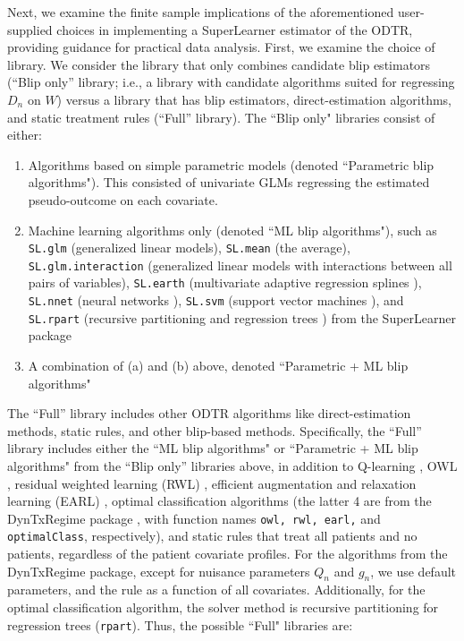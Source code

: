 \documentclass[a4paper,12pt]{article}
\begin{document}
Next, we examine the finite sample implications of the aforementioned user-supplied choices in implementing a SuperLearner estimator of the ODTR, providing guidance for practical data analysis. First, we examine the choice of library. We consider the library that only combines candidate blip estimators (``Blip only” library; i.e., a library with candidate algorithms suited for regressing $D_n$ on $W$) versus a library that has blip estimators, direct-estimation algorithms, and static treatment rules (``Full” library). The ``Blip only" libraries consist of either:
\begin{enumerate}
    \item[(a)] Algorithms based on simple parametric models (denoted ``Parametric blip algorithms"). This consisted of univariate GLMs regressing the estimated pseudo-outcome on each covariate.
    \item[(b)] Machine learning algorithms only (denoted ``ML blip algorithms"), such as \texttt{SL.glm} (generalized linear models), \texttt{SL.mean} (the average), \texttt{SL.glm.interaction} (generalized linear models with interactions between all pairs of variables), \texttt{SL.earth} (multivariate adaptive regression splines \citep{friedman1991multivariate}), \texttt{SL.nnet} (neural networks \citep{ripley1996pattern}), \texttt{SL.svm} (support vector machines \citep{chang2011libsvm}), and \texttt{SL.rpart} (recursive partitioning and regression trees \citep{breiman2017classification}) from the SuperLearner package \citep{SLpackage}
    \item[(c)] A combination of (a) and (b) above, denoted ``Parametric + ML blip algorithms"
\end{enumerate}

The ``Full” library includes other ODTR algorithms like direct-estimation methods, static rules, and other blip-based methods. Specifically, the ``Full” library includes either the ``ML blip algorithms" or ``Parametric + ML blip algorithms" from the ``Blip only” libraries above, in addition to Q-learning \citep{kosorok2015adaptive}, OWL \citep{zhao2012estimating}, residual weighted learning (RWL) \citep{zhou2017residual}, efficient augmentation and relaxation learning (EARL) \citep{zhao2019efficient}, optimal classification algorithms \citep{zhang2012estimatingclass} (the latter 4 are from the DynTxRegime package \citep{DynTxRegime}, with function names \texttt{owl, rwl, earl,} and \texttt{optimalClass}, respectively), and static rules that treat all patients and no patients, regardless of the patient covariate profiles. For the algorithms from the DynTxRegime package, except for nuisance parameters $Q_n$ and $g_n$, we use default parameters, and the rule as a function of all covariates. Additionally, for the optimal classification algorithm, the solver method is recursive partitioning for regression trees (\texttt{rpart}). Thus, the possible ``Full" libraries are:
\end{document}
